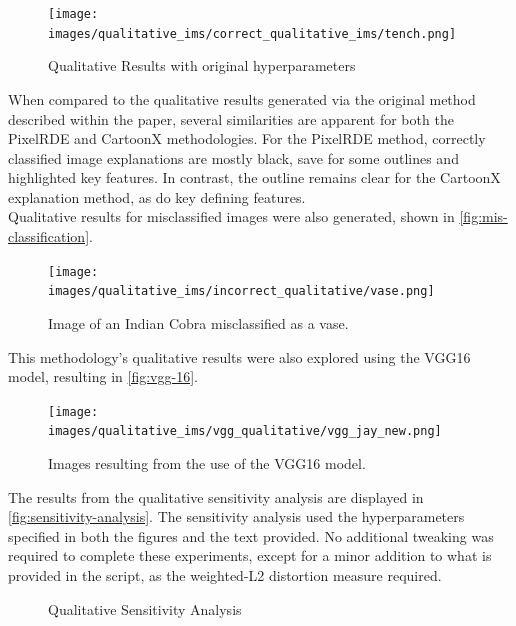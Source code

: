 \begin{figure}[H]
    \centering
    \texttt{[image: images/qualitative\_ims/correct\_qualitative\_ims/tench.png]}
    \caption{Qualitative Results with original hyperparameters}
    \label{fig:results-qual-1}
\end{figure}
When compared to the qualitative results generated via the original method described within the paper, several similarities are apparent for both the PixelRDE and CartoonX methodologies. For the PixelRDE method, correctly classified image explanations are mostly black, save for some outlines and highlighted key features. In contrast, the outline remains clear for the CartoonX explanation method, as do key defining features. \\
Qualitative results for misclassified images were also generated, shown in \autoref{fig:mis-classification}.
\begin{figure}[ht]
    \centering
    \texttt{[image: images/qualitative\_ims/incorrect\_qualitative/vase.png]}
    \caption{Image of an Indian Cobra misclassified as a vase.}
    \label{fig:mis-classification}
\end{figure}
This methodology's qualitative results were also explored using the VGG16 model, resulting in \autoref{fig:vgg-16}.
\begin{figure}[ht]
    \centering
    \texttt{[image: images/qualitative\_ims/vgg\_qualitative/vgg\_jay\_new.png]}
    \caption{Images resulting from the use of the VGG16 model.}
    \label{fig:vgg-16}
\end{figure}

The results from the qualitative sensitivity analysis are displayed in \autoref{fig:sensitivity-analysis}. The sensitivity analysis used the hyperparameters specified in both the figures and the text provided. No additional tweaking was required to complete these experiments, except for a minor addition to what is provided in the script, as the weighted-L2 distortion measure required. 

\begin{figure}[ht]

\centering
{}\hfil
{}


\hfil   
{}

\caption{Qualitative Sensitivity Analysis}\label{fig:sensitivity-analysis}
\end{figure}


